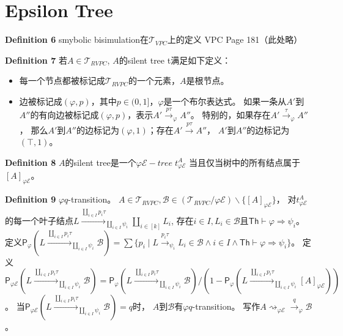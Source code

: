 \section{Epsilon Tree}

\textbf{Definition 6} smybolic bisimulation在$\mathcal{T}_{VPC}$上的定义 VPC Page 181（此处略）

\textbf{Definition 7} 若$A\in \mathcal{T}_{RVPC}$,
$A$的silent tree t满足如下定义：
\begin{itemize}
   \item 每一个节点都被标记成$\mathcal{T}_{RVPC}$的一个元素，$A$是根节点。
   \item {
      边被标记成$(\varphi,p)$，其中$p\in(0,1]$，$\varphi$是一个布尔表达式。
      如果一条从$A'$到$A''$的有向边被标记成$(\varphi,p)$，表示$A'\stackrel{p\tau}{\rightarrow}_{\varphi} A''$。
      特别的，如果存在$A'\stackrel{\tau}{\rightarrow}_{\varphi}A''$，
      那么$A'$到$A''$的边标记为$(\varphi, 1)$；存在$A'\stackrel{p\tau}{\rightarrow}A''$，
      $A'$到$A''$的边标记为$(\top, 1)$。
   }
\end{itemize}

\textbf{Definition 8} $A$的silent tree是一个$\varphi \mathcal{E}-tree\; t^A_{\varphi \mathcal{E}}$ 
当且仅当树中的所有结点属于$[A]_{\varphi \mathcal{E}}$。

\textbf{Definition 9} $\varphi q$-transition。
$A\in \mathcal{T}_{RVPC},\mathcal{B}\in (\mathcal{T}_{RVPC}/\varphi \mathcal{E})\backslash \{[A]_{\varphi\mathcal{E}}\}$，
对$t^A_{\varphi \mathcal{E}}$的每一个叶子结点$L\stackrel{\coprod_{i\in I}p_i\tau}{\longrightarrow}_{\coprod_{i\in I}\psi_i} \coprod_{i\in [k]}L_i$,
存在$i\in I, L_i\in \mathcal{B}$且$\mathsf{Th}\vdash \varphi \Rightarrow \psi_i$。
定义$\mathsf{P}_\varphi(L\stackrel{\coprod_{i\in I}p_i\tau}{\longrightarrow}_{\coprod_{i\in I}\psi_i}\mathcal{B}) = \sum\{p_i\mid L\stackrel{p_i\tau}{\rightarrow}_{\psi_i} L_i\in\mathcal{B} \wedge i\in I \wedge \mathsf{Th}\vdash \varphi \Rightarrow \psi_i\}$。
定义$\mathsf{P}_{\varphi \mathcal{E}}(L\stackrel{\coprod_{i\in I}p_i\tau}{\longrightarrow}_{\coprod_{i\in I}\psi_i}\mathcal{B}) = \mathsf{P}_\varphi(L\stackrel{\coprod_{i\in I}p_i\tau}{\longrightarrow}_{\coprod_{i\in I}\psi_i}\mathcal{B})/(1-\mathsf{P}_\varphi(L\stackrel{\coprod_{i\in I}p_i\tau}{\longrightarrow}_{\coprod_{i\in I}\psi_i}[A]_{\varphi\mathcal{E}}))$。
当$\mathsf{P}_{\varphi \mathcal{E}}(L\stackrel{\coprod_{i\in I}p_i\tau}{\longrightarrow}_{\coprod_{i\in I}\psi_i}\mathcal{B})=q$时，
$A$到$\mathcal{B}$有$\varphi q$-transition。
写作$A\rightsquigarrow_{\varphi\mathcal{E}} \stackrel{q}{\rightarrow}_{\varphi} \mathcal{B}$。


